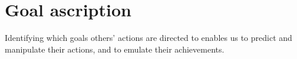 \documentclass[12pt,a4paper]{extarticle}
\begin{document}
\setlength\footnotesep{1em}


\maketitle

\begin{abstract}
***
\end{abstract}


\section{Goal ascription}
Identifying which goals others' actions are directed to enables us to predict and manipulate their actions, and to emulate their achievements.





\end{document}
